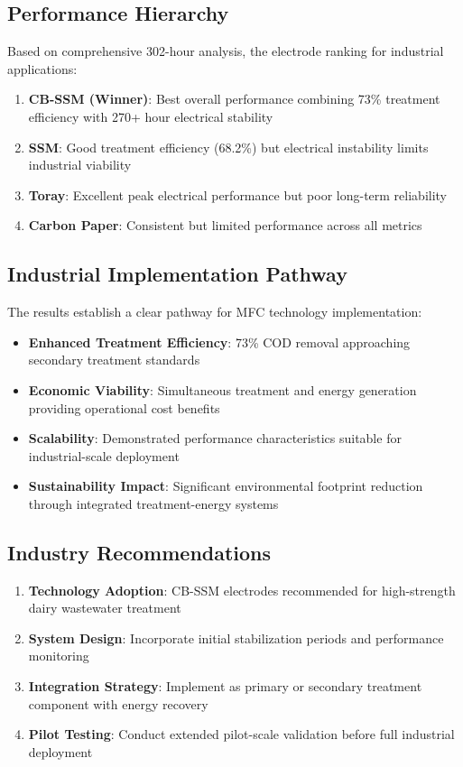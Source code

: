 \documentclass[12pt,a4paper]{article}
\begin{document}
\subsection{Performance Hierarchy}

Based on comprehensive 302-hour analysis, the electrode ranking for industrial applications:

\begin{enumerate}
    \item \textbf{CB-SSM (Winner)}: Best overall performance combining 73\% treatment efficiency with 270+ hour electrical stability
    \item \textbf{SSM}: Good treatment efficiency (68.2\%) but electrical instability limits industrial viability
    \item \textbf{Toray}: Excellent peak electrical performance but poor long-term reliability
    \item \textbf{Carbon Paper}: Consistent but limited performance across all metrics
\end{enumerate}

\subsection{Industrial Implementation Pathway}

The results establish a clear pathway for MFC technology implementation:

\begin{itemize}
    \item \textbf{Enhanced Treatment Efficiency}: 73\% COD removal approaching secondary treatment standards
    \item \textbf{Economic Viability}: Simultaneous treatment and energy generation providing operational cost benefits
    \item \textbf{Scalability}: Demonstrated performance characteristics suitable for industrial-scale deployment
    \item \textbf{Sustainability Impact}: Significant environmental footprint reduction through integrated treatment-energy systems
\end{itemize}

\subsection{Industry Recommendations}

\begin{enumerate}
    \item \textbf{Technology Adoption}: CB-SSM electrodes recommended for high-strength dairy wastewater treatment
    \item \textbf{System Design}: Incorporate initial stabilization periods and performance monitoring
    \item \textbf{Integration Strategy}: Implement as primary or secondary treatment component with energy recovery
    \item \textbf{Pilot Testing}: Conduct extended pilot-scale validation before full industrial deployment
\end{enumerate}
\end{document}
